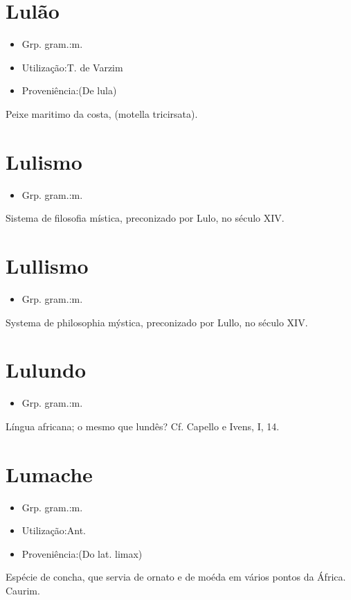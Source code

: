 \section{Lulão}
\begin{itemize}
\item {Grp. gram.:m.}
\end{itemize}
\begin{itemize}
\item {Utilização:T. de Varzim}
\end{itemize}
\begin{itemize}
\item {Proveniência:(De \textunderscore lula\textunderscore )}
\end{itemize}
Peixe maritimo da costa, (\textunderscore motella tricirsata\textunderscore ).
\section{Lulismo}
\begin{itemize}
\item {Grp. gram.:m.}
\end{itemize}
Sistema de filosofia mística, preconizado por Lulo, no século XIV.
\section{Lullismo}
\begin{itemize}
\item {Grp. gram.:m.}
\end{itemize}
Systema de philosophia mýstica, preconizado por Lullo, no século XIV.
\section{Lulundo}
\begin{itemize}
\item {Grp. gram.:m.}
\end{itemize}
Língua africana; o mesmo que \textunderscore lundês\textunderscore ? Cf. Capello e Ivens, I, 14.
\section{Lumache}
\begin{itemize}
\item {Grp. gram.:m.}
\end{itemize}
\begin{itemize}
\item {Utilização:Ant.}
\end{itemize}
\begin{itemize}
\item {Proveniência:(Do lat. \textunderscore limax\textunderscore )}
\end{itemize}
Espécie de concha, que servia de ornato e de moéda em vários pontos da África.
Caurim.
